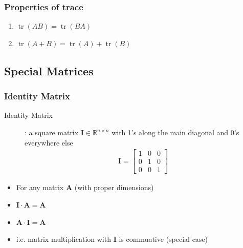 \documentclass[letterpaper,12pt]{article}
\newcommand{\matr}[1]{\mathbf{#1}}
\DeclareMathOperator{\tr}{tr}
\begin{document}
\subsubsection{Properties of trace}
\begin{enumerate}
 \item $\tr(AB) = \tr(BA)$
 \item $\tr(A + B) = \tr(A) + \tr(B)$
\end{enumerate}

\subsection{Special Matrices}

\subsubsection{Identity Matrix}
\begin{description}
 \item[Identity Matrix]: a square matrix $\matr{I} \in \mathbb{R}^{n \times n}$ with 1's along the main diagonal and 0's everywhere else
       \begin{align}
        \matr{I} = \begin{bmatrix}
         1 & 0 & 0 \\
         0 & 1 & 0 \\
         0 & 0 & 1
        \end{bmatrix}
       \end{align}
\end{description}
\begin{itemize}
 \item For any matrix $\matr{A}$ (with proper dimensions)
 \item $\matr{I} \cdot \matr{A} = \matr{A}$
 \item $\matr{A} \cdot \matr{I} = \matr{A}$
 \item i.e. matrix multiplication with $\matr{I}$ is commuative (special case)
\end{itemize}
\end{document}
